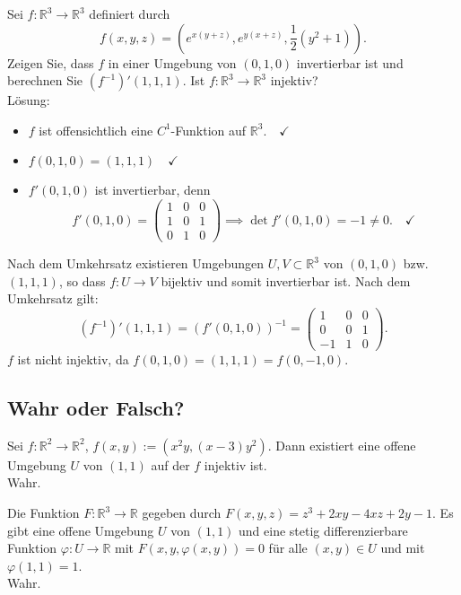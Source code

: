 \documentclass[parskip=full]{scrartcl}
\begin{document}
Sei $f : \mathbb{R}^3 \to \mathbb{R}^3$ definiert durch
\begin{displaymath}
  f(x,y,z) = \left(e^{x(y + z)}, e^{y(x + z)}, \frac{1}{2}(y^2 + 1)\right).
\end{displaymath}
Zeigen Sie, dass $f$ in einer Umgebung von $(0,1,0)$ invertierbar ist und berechnen Sie $(f^{-1})'(1,1,1)$.
Ist $f : \mathbb{R}^3 \to \mathbb{R}^3$ injektiv?\\
Lösung:
\begin{itemize}
    \item $f$ ist offensichtlich eine $C^1$-Funktion auf $\mathbb{R}^3. \quad \checkmark$
    \item $f(0,1,0) = (1,1,1) \quad \checkmark$
    \item $f'(0,1,0)$ ist invertierbar, denn
    \begin{displaymath}
      f'(0,1,0) = 
      \begin{pmatrix}
        1 & 0 & 0\\
        1 & 0 & 1\\
        0 & 1 & 0
      \end{pmatrix}
      \implies \det f'(0,1,0) = -1 \neq 0. \quad \checkmark
    \end{displaymath}
\end{itemize}
Nach dem Umkehrsatz existieren Umgebungen $U,V \subset \mathbb{R}^3$ von $(0,1,0)$ bzw. $(1,1,1)$, so dass $f : U \to V$ bijektiv und somit invertierbar ist.
Nach dem Umkehrsatz gilt:
\begin{displaymath}
  (f^{-1})'(1,1,1) = (f'(0,1,0))^{-1} =
  \begin{pmatrix}
    1 & 0 & 0\\
    0 & 0 & 1\\
    -1 & 1 & 0
  \end{pmatrix}.
\end{displaymath}
$f$ ist nicht injektiv, da $f(0,1,0) = (1,1,1) = f(0,-1,0)$.

\subsection{Wahr oder Falsch?}
Sei $f : \mathbb{R}^2 \to \mathbb{R}^2$, $f(x,y) := (x^2y, (x-3)y^2)$.
Dann existiert eine offene Umgebung $U$ von $(1,1)$ auf der $f$ injektiv ist.\\
Wahr.

Die Funktion $F : \mathbb{R}^3 \to \mathbb{R}$ gegeben durch $F(x,y,z) = z^3 + 2xy - 4xz + 2y - 1$.
Es gibt eine offene Umgebung $U$ von $(1,1)$ und eine stetig differenzierbare Funktion $\varphi : U \to \mathbb{R}$ mit $F(x,y,\varphi(x,y)) = 0$ für alle $(x,y) \in U$ und mit $\varphi(1,1) = 1$.\\
Wahr.
\end{document}
